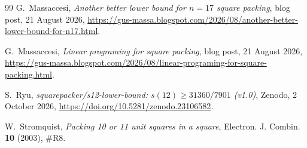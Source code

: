 \documentclass[11pt]{amsart}
\theoremstyle{definition}
\theoremstyle{remark}
\begin{document}
\begin{thebibliography}{99}
G.~Massaccesi, \emph{Another better lower bound for $n=17$ square packing}, blog post, 21 August 2026, \url{https://gus-massa.blogspot.com/2026/08/another-better-lower-bound-for-n17.html}.

G.~Massaccesi, \emph{Linear programing for square packing}, blog post, 21 August 2026, \url{https://gus-massa.blogspot.com/2026/08/linear-programing-for-square-packing.html}.

S.~Ryu, \emph{squarepacker/s12-lower-bound: $s(12)\ge31360/7901$ (v1.0)}, Zenodo, 2 October 2026, \url{https://doi.org/10.5281/zenodo.23106582}.

W.~Stromquist, \emph{Packing 10 or 11 unit squares in a square}, Electron. J. Combin. \textbf{10} (2003), \#R8.

\end{thebibliography}
\end{document}
